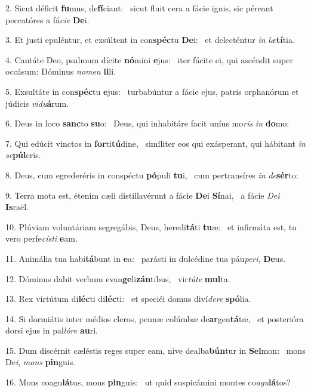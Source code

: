 2. Sicut déficit \textbf{fu}mus, de\textbf{fí}ciant: \ast\  sicut fluit cera a fácie ignis, sic péreant peccatóres a fá\textit{ci}\textit{e} \textbf{De}i.\

3. Et justi epuléntur, et exsúltent in con\textbf{spéc}tu \textbf{De}i: \ast\  et delecténtur \textit{in} \textit{læ}\textbf{tí}tia.\

4. Cantáte Deo, psalmum dícite \textbf{nó}mini \textbf{e}jus: \ast\  iter fácite ei, qui ascéndit super occásum: Dóminus \textit{no}\textit{men} \textbf{il}li.\

5. Exsultáte in con\textbf{spéc}tu \textbf{e}jus: \ast\  turbabúntur a fácie ejus, patris orphanórum et júdicis \textit{vi}\textit{du}\textbf{á}rum.\

6. Deus in loco \textbf{sanc}to \textbf{su}o: \ast\  Deus, qui inhabitáre facit uníus mo\textit{ris} \textit{in} \textbf{do}mo:\

7. Qui edúcit vinctos in \textbf{for}ti\textbf{tú}dine, \ast\  simíliter eos qui exásperant, qui hábitant \textit{in} \textit{se}\textbf{púl}cris.\

8. Deus, cum egrederéris in conspéctu \textbf{pó}puli \textbf{tu}i, \ast\  cum pertransíres \textit{in} \textit{de}\textbf{sér}to:\

9. Terra mota est, étenim cæli distillavérunt a fácie \textbf{De}i \textbf{Sí}nai, \ast\  a fácie \textit{De}\textit{i} \textbf{Is}raël.\

10. Plúviam voluntáriam segregábis, Deus, heredi\textbf{tá}ti \textbf{tu}æ: \ast\  et infirmáta est, tu vero perfe\textit{cís}\textit{ti} \textbf{e}am.\

11. Animália tua habi\textbf{tá}bunt in \textbf{e}a: \ast\  parásti in dulcédine tua páu\textit{pe}\textit{ri}, \textbf{De}us.\

12. Dóminus dabit verbum evan\textbf{ge}li\textbf{zán}tibus, \ast\  vir\textit{tú}\textit{te} \textbf{mul}ta.\

13. Rex virtútum di\textbf{léc}ti di\textbf{léc}ti: \ast\  et speciéi domus diví\textit{de}\textit{re} \textbf{spó}lia.\

14. Si dormiátis inter médios cleros, pennæ colúmbæ de\textbf{ar}gen\textbf{tá}tæ, \ast\  et posterióra dorsi ejus in pal\textit{ló}\textit{re} \textbf{au}ri.\

15. Dum discérnit cæléstis reges super eam, nive dealba\textbf{bún}tur in \textbf{Sel}mon: \ast\  mons De\textit{i}, \textit{mons} \textbf{pin}guis.\

16. Mons coagu\textbf{lá}tus, mons \textbf{pin}guis: \ast\  ut quid suspicámini montes co\textit{a}\textit{gu}\textbf{lá}tos?\


